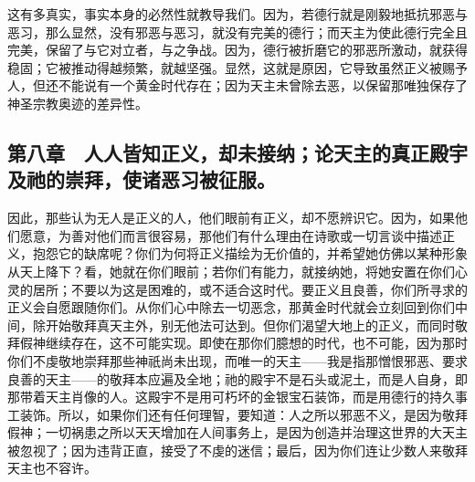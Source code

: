 这有多真实，事实本身的必然性就教导我们。因为，若德行就是刚毅地抵抗邪恶与恶习，那么显然，没有邪恶与恶习，就没有完美的德行；而天主为使此德行完全且完美，保留了与它对立者，与之争战。因为，德行被折磨它的邪恶所激动，就获得稳固；它被推动得越频繁，就越坚强。显然，这就是原因，它导致虽然正义被赐予人，但还不能说有一个黄金时代存在；因为天主未曾除去恶，以保留那唯独保存了神圣宗教奥迹的差异性。\par


\subsection{第八章　人人皆知正义，却未接纳；论天主的真正殿宇及祂的崇拜，使诸恶习被征服。}

因此，那些认为无人是正义的人，他们眼前有正义，却不愿辨识它。因为，如果他们愿意，为善对他们而言很容易，那他们有什么理由在诗歌或一切言谈中描述正义，抱怨它的缺席呢？你们为何将正义描绘为无价值的，并希望她仿佛以某种形象从天上降下？看，她就在你们眼前；若你们有能力，就接纳她，将她安置在你们心灵的居所；不要以为这是困难的，或不适合这时代。要正义且良善，你们所寻求的正义会自愿跟随你们。从你们心中除去一切恶念，那黄金时代就会立刻回到你们中间，除开始敬拜真天主外，别无他法可达到。但你们渴望大地上的正义，而同时敬拜假神继续存在，这不可能实现。即使在那你们臆想的时代，也不可能，因为那时你们不虔敬地崇拜那些神祇尚未出现，而唯一的天主——我是指那憎恨邪恶、要求良善的天主——的敬拜本应遍及全地；祂的殿宇不是石头或泥土，而是人自身，即那带着天主肖像的人。这殿宇不是用可朽坏的金银宝石装饰，而是用德行的持久事工装饰。所以，如果你们还有任何理智，要知道：人之所以邪恶不义，是因为敬拜假神；一切祸患之所以天天增加在人间事务上，是因为创造并治理这世界的大天主被忽视了；因为违背正直，接受了不虔的迷信；最后，因为你们连让少数人来敬拜天主也不容许。\par

